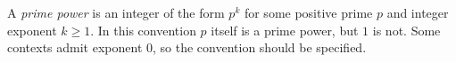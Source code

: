 
A \emph{prime power} is an integer of the form $p^k$ for some positive prime $p$ and integer exponent $k\ge1$. In this convention $p$ itself is a prime power, but $1$ is not. Some contexts admit exponent $0$, so the convention should be specified.

